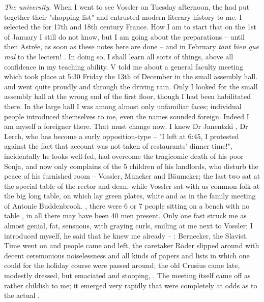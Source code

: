 \textit{The university}. When I went to see Vossler on Tuesday afternoon, the  had put together their "shopping list" and entrusted modern literary history to me. I selected the  for 17th and 18th century France. How I am to start that on the 1st of January I still do not know, but I am going about the preparations -- until then Astrée, as soon as these notes here are done -- and in February \textit{tant bien que mal} to the lectern! . In doing so, I shall learn all sorts of things, above all confidence in my teaching ability. V told me about a general faculty meeting which took place at 5:30 Friday the 13th of December in the small assembly hall.  and went quite proudly and  through the driving rain. Only I looked for the small assembly hall at the wrong end of the first floor, though I had been habilitated there. In the large hall I was among almost only unfamiliar faces; individual people introduced themselves to me, even the names sounded foreign. Indeed I am myself a foreigner there. That must change now. I knew Dr Janentzki , Dr Lerch, who has become a surly opposition-type -- "I left at 6:45, I protested against the fact that account was not taken of restaurants' dinner time!", incidentally he looks well-fed, had overcome the tragicomic death of his poor Sonja, and now only complains of the 5 children of his landlords, who disturb the peace of his furnished room -- Vossler, Muncker and Bäumcker; the last two sat at the special table of the rector and dean, while Vossler sat with us common folk at the big long table, on which lay green plates, white  and  as in the family meeting of Antonie Buddenbrook. , there were 6 or 7 people sitting on a bench with no table , in all there may have been 40 men present. Only one fast struck me as almost genial, fat, sensuous, with graying curls, smiling at me next to Vossler; I introduced myself, he said that he knew me already -- : Bernecker, the Slavist. Time went on and people came and left, the caretaker Röder slipped around with decent ceremonious noiselessness and all kinds of papers and lists in which one could  for the holiday course were passed around; the old Crusius came late, modestly dressed, but emaciated and stooping, . The meeting itself came off as rather childish to me; it emerged very rapidly that  were completely at odds as to the actual .